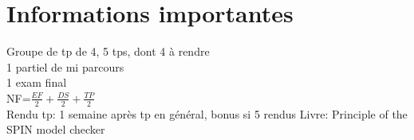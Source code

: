 \section{Informations importantes}
Groupe de tp de 4, 5 tps, dont 4 à rendre\\
1 partiel de mi parcours\\
1 exam final\\
NF=$\frac{EF}{2}+\frac{DS}{2}+\frac{TP}{2}$\\
Rendu tp: 1 semaine après tp en général, bonus si 5 
rendus
Livre: Principle of the SPIN model checker
